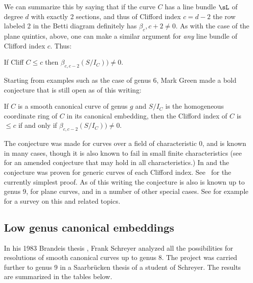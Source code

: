 We can summarize this by saying
that if the curve $C$ has a line bundle $\sL$ of degree $d$ with exactly 2 sections, and thus of Clifford index $c = d-2$ the row labeled  2 
in the Betti diagram definitely has $\beta_c, c+2\neq 0$. As with the case of the plane quintics, above, one can
make a similar argument for \emph{any} line bundle of Clifford index $c$. Thus:

\begin{corollary}
 If Cliff $C \leq c$ then $\beta_{c,c-2}(S/I_C)) \neq 0.$
\end{corollary}
 

Starting from examples such as the case of genus 6, Mark Green made a bold conjecture that is still open as of this writing:

\begin{conjecture}
If $C$ is a smooth canonical curve of genus $g$ and $S/I_C$ is the homogeneous coordinate ring of $C$ in its canonical embedding,
then the Clifford index of $C$ is $\leq c$ if and only if $\beta_{c,c-2}(S/I_C)) \neq 0$. 
\end{conjecture}

The conjecture was made for curves over a field of characteristic 0, and is known in many cases, though it is also known to fail in small finite characteristics (see~\cite{Bopp-Schreyer} for an amended conjecture that may hold in all characteristics.)
In \cite{MR1941089} and \cite{MR2157134} the conjecture was proven for generic curves of each Clifford index.  See~\cite{MR4022070} for the currently simplest
proof. As of this writing the conjecture is also is known up to genus 9,  for plane curves, and in a number of other special cases.
See for example \cite{Farkas-progress-on-syzygies} for a survey on this and related topics.

\subsection{Low genus canonical embeddings} 
In his 1983 Brandeis thesis \cite{Schreyer-canonical}, Frank Schreyer analyzed all the possibilities for resolutions of smooth canonical curves up to genus 8. The project was carried further to genus 9 in a Saarbr\"ucken thesis \cite{Sagraloff}  of a student of Schreyer. The results are summarized in the tables below.

